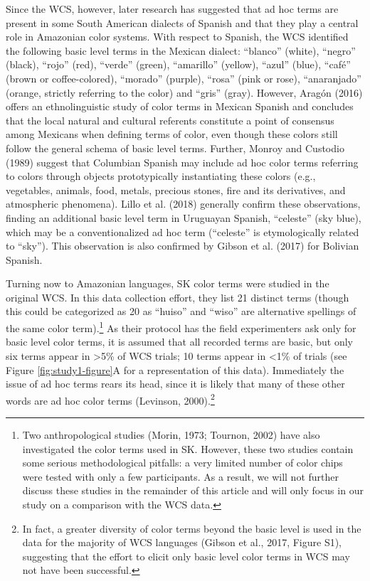 \documentclass[
  english,
  ,apa7,floatsintext]{apa6}
\begin{document}
Since the WCS, however, later research has suggested that ad hoc terms are present in some South American dialects of Spanish and that they play a central role in Amazonian color systems. With respect to Spanish, the WCS identified the following basic level terms in the Mexican dialect: ``blanco'' (white), ``negro'' (black), ``rojo'' (red), ``verde'' (green), ``amarillo'' (yellow), ``azul'' (blue), ``café'' (brown or coffee-colored), ``morado'' (purple), ``rosa'' (pink or rose), ``anaranjado'' (orange, strictly referring to the color) and ``gris'' (gray). However, Aragón (2016) offers an ethnolinguistic study of color terms in Mexican Spanish and concludes that the local natural and cultural referents constitute a point of consensus among Mexicans when defining terms of color, even though these colors still follow the general schema of basic level terms. Further, Monroy and Custodio (1989) suggest that Columbian Spanish may include ad hoc color terms referring to colors through objects prototypically instantiating these colors (e.g., vegetables, animals, food, metals, precious stones, fire and its derivatives, and atmospheric phenomena). Lillo et al. (2018) generally confirm these observations, finding an additional basic level term in Uruguayan Spanish, ``celeste'' (sky blue), which may be a conventionalized ad hoc term (``celeste'' is etymologically related to ``sky''). This observation is also confirmed by Gibson et al. (2017) for Bolivian Spanish.

Turning now to Amazonian languages, SK color terms were studied in the original WCS. In this data collection effort, they list 21 distinct terms (though this could be categorized as 20 as ``huiso'' and ``wiso'' are alternative spellings of the same color term).\footnote{Two anthropological studies (Morin, 1973; Tournon, 2002) have also investigated the color terms used in SK. However, these two studies contain some serious methodological pitfalls: a very limited number of color chips were tested with only a few participants. As a result, we will not further discuss these studies in the remainder of this article and will only focus in our study on a comparison with the WCS data.} As their protocol has the field experimenters ask only for basic level color terms, it is assumed that all recorded terms are basic, but only six terms appear in \textgreater5\% of WCS trials; 10 terms appear in \textless1\% of trials (see Figure \ref{fig:study1-figure}A for a representation of this data). Immediately the issue of ad hoc terms rears its head, since it is likely that many of these other words are ad hoc color terms (Levinson, 2000).\footnote{In fact, a greater diversity of color terms beyond the basic level is used in the data for the majority of WCS languages (Gibson et al., 2017, Figure S1), suggesting that the effort to elicit only basic level color terms in WCS may not have been successful.}
\end{document}
